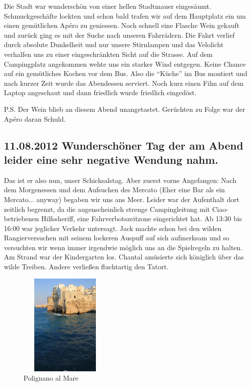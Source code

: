 Die Stadt war wunderschön von einer hellen Stadtmauer eingesäumt.
Schmuckgeschäfte lockten und schon bald trafen wir auf dem Hauptplatz ein um einen gemütlichen Apéro zu geniessen.
Noch schnell eine Flasche Wein gekauft und zurück ging es mit der Suche nach unseren Fahrrädern.
Die Fahrt verlief durch absolute Dunkelheit und nur unsere Stirnlampen und das Velolicht verhalfen uns zu einer eingeschränkten Sicht auf die Strasse.
Auf dem Campingplatz angekommen wehte uns ein starker Wind entgegen.
Keine Chance auf ein gemütliches Kochen vor dem Bus.
Also die "`Küche"' im Bus montiert und nach kurzer Zeit wurde das Abendessen serviert.
Noch kurz einen Film auf dem Laptop angeschaut und dann friedlich wurde friedlich eingedöst.

P.S. Der Wein blieb an diesem Abend unangetastet. Gerüchten zu Folge war der Apéro daran Schuld.

\subsection{11.08.2012 Wunderschöner Tag der am Abend leider eine sehr negative Wendung nahm.}
Das ist er also nun, unser Schicksalstag. 
Aber zuerst vorne Angefangen: Nach dem Morgenessen und dem Aufsuchen des Mercato (Eher eine Bar als ein Mercato... anyway) begaben wir uns ans Meer.
Leider war der Aufenthalt dort zeitlich begrenzt, da die augenscheinlich strenge Campingleitung mit Ciao-betriebenen Hilfssheriff, eine Fahrverbotszeitzone eingerichtet hat.
Ab 13:30 bis 16:00 war jeglicher Verkehr untersagt.
Jack machte schon bei den wilden Rangierversuchen mit seinem lockeren Auspuff auf sich aufmerksam und so versuchten wir wenn immer irgendwie möglich uns an die Spielregeln zu halten.
Am Strand war der Kindergarten los.
Chantal amüsierte sich königlich über das wilde Treiben.
Andere verließen fluchtartig den Tatort.

\begin{figure} 
  \begin{centering}
    \includegraphics[width=0.4\textwidth, height=5cm, keepaspectratio]{../Bilder/Sommer2012/54.jpg}
    \caption{Polignano al Mare}
  \end{centering}
\end{figure} 

